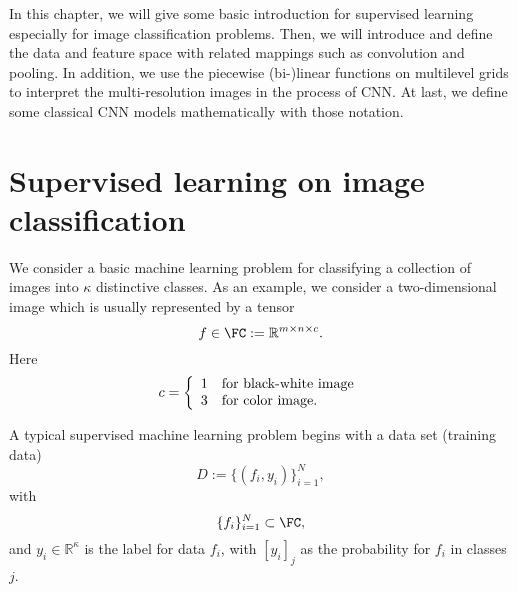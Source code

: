 In this chapter, we will give some basic introduction for supervised 
learning especially for image classification problems. 
Then, we will introduce and define the data and feature space
with related mappings such as convolution and pooling.
In addition, we use the  piecewise (bi-)linear functions on multilevel grids to
interpret the multi-resolution images in the process of CNN. At last, 
we define some classical CNN models mathematically with those notation. 


\section{Supervised learning on image classification}\label{sec:MLbasics}
We consider a basic machine learning problem for classifying a
collection of images into $\kappa$ distinctive classes.  As an
example, we consider a two-dimensional image which is usually
represented by a tensor
$$
f\in \mathbb  \FC := \mathbb{R}^{m\times n\times c}.
$$
Here 
\begin{equation}
\label{data-c}
c=
\left\{
\begin{array}[rl]{rl}
1 & \mbox{for black-white image}\\    
3 & \mbox{for color image}.
\end{array}
\right.
\end{equation}

A typical supervised machine learning problem begins with a data set (training data)
$$
D := \{(f_i, y_i)\}_{i=1}^N,
$$ 
with
$$
\{f_i\}_{i=1}^N \subset \FC,
$$
and $y_i \in \mathbb{R}^{\kappa}$ is the label for data $f_i$, with
$[y_i]_j$ as the probability for $f_i$ in classes $j$. 


